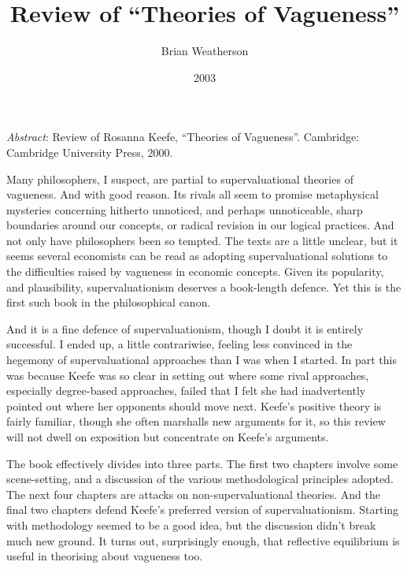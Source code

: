 \documentclass[
  11pt,
  letterpaper,
  DIV=11,
  numbers=noendperiod,
  twoside]{scrartcl}
\title{Review of ``Theories of Vagueness''}
\author{Brian Weatherson}
\date{2003}
\renewenvironment{abstract}
 {\vspace{-1.25cm}
 \quotation\small\noindent\emph{Abstract}:}
 {\endquotation}
\begin{document}
\maketitle
\begin{abstract}
Review of Rosanna Keefe, ``Theories of Vagueness''. Cambridge: Cambridge
University Press, 2000.
\end{abstract}


Many philosophers, I suspect, are partial to supervaluational theories
of vagueness. And with good reason. Its rivals all seem to promise
metaphysical mysteries concerning hitherto unnoticed, and perhaps
unnoticeable, sharp boundaries around our concepts, or radical revision
in our logical practices. And not only have philosophers been so
tempted. The texts are a little unclear, but it seems several economists
can be read as adopting supervaluational solutions to the difficulties
raised by vagueness in economic concepts. Given its popularity, and
plausibility, supervaluationism deserves a book-length defence. Yet this
is the first such book in the philosophical canon.

And it is a fine defence of supervaluationism, though I doubt it is
entirely successful. I ended up, a little contrariwise, feeling less
convinced in the hegemony of supervaluational approaches than I was when
I started. In part this was because Keefe was so clear in setting out
where some rival approaches, especially degree-based approaches, failed
that I felt she had inadvertently pointed out where her opponents should
move next. Keefe's positive theory is fairly familiar, though she often
marshalls new arguments for it, so this review will not dwell on
exposition but concentrate on Keefe's arguments.

The book effectively divides into three parts. The first two chapters
involve some scene-setting, and a discussion of the various
methodological principles adopted. The next four chapters are attacks on
non-supervaluational theories. And the final two chapters defend Keefe's
preferred version of supervaluationism. Starting with methodology seemed
to be a good idea, but the discussion didn't break much new ground. It
turns out, surprisingly enough, that reflective equilibrium is useful in
theorising about vagueness too.
\end{document}
